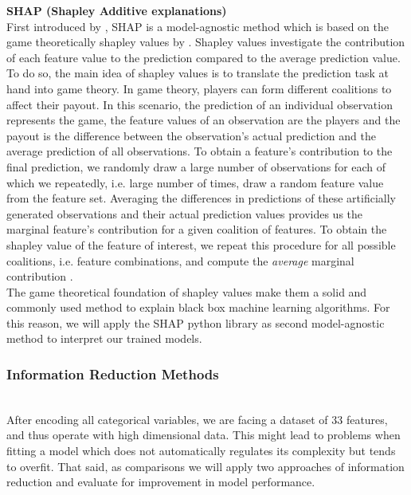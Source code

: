 \documentclass[12pt]{article}
\begin{document}
\noindent \textbf{SHAP (Shapley Additive explanations)} \\
\noindent First introduced by \cite{lundberg2017unified}, SHAP is a model-agnostic method which is based on the game theoretically shapley values by \cite{shapely1953}. Shapley values investigate the contribution of each feature value to the prediction compared to the average prediction value. To do so, the main idea of shapley values is to translate the prediction task at hand into game theory. In game theory, players can form different coalitions to affect their payout. In this scenario, the prediction of an individual observation represents the game, the feature values of an observation are the players and the payout is the difference between the observation's actual prediction and the average prediction of all observations. To obtain a feature's contribution to the final prediction, we randomly draw a large number of observations for each of which we repeatedly, i.e. large number of times, draw a random feature value from the feature set. Averaging the differences in predictions of these artificially generated observations and their actual prediction values provides us the marginal feature's contribution for a given coalition of features. To obtain the shapley value of the feature of interest, we repeat this procedure for all possible coalitions, i.e. feature combinations, and compute the \textit{average} marginal contribution \cite{molnar2023}.\\

\noindent The game theoretical foundation of shapley values make them a solid and commonly used method to explain black box machine learning algorithms. For this reason, we will apply the SHAP python library as second model-agnostic method to interpret our trained models.


\subsubsection{Information Reduction Methods}\\

\noindent After encoding all categorical variables, we are facing a dataset of 33 features, and thus operate with high dimensional data. This might lead to problems when fitting a model which does not automatically regulates its complexity but tends to overfit. That said, as comparisons we will apply two approaches of information reduction and evaluate for improvement in model performance.\\
\end{document}
